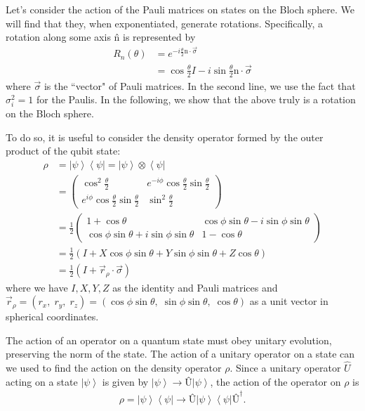 \documentclass[11pt]{article} %
\newcommand{\bra}[1]{\left\langle #1 \right|}
\newcommand{\ket}[1]{\left|#1\right\rangle}
\begin{document}
Let's consider the action of the Pauli matrices on states on the Bloch sphere. We will find that they, when exponentiated, generate rotations. Specifically, a rotation along some axis \^n is represented by
\begin{align}
    R_n(\theta) &= e^{-i\frac{\theta}{2}\textrm{\^n}\cdot\vec{\sigma}}\\
    &= \cos\frac{\theta}{2} I - i\sin\frac{\theta}{2} \textrm{\^n}\cdot\vec{\sigma}
\end{align}
where $\vec{\sigma}$ is the ``vector" of Pauli matrices. In the second line, we use the fact that $\sigma_i^2 = 1$ for the Paulis. In the following, we show that the above truly is a rotation on the Bloch sphere.

To do so, it is useful to consider the density operator formed by the outer product of the qubit state:
\begin{align}
    \rho &= \ket{\psi}\bra{\psi} = \ket{\psi}\otimes\bra{\psi}\\
    &=
        \begin{pmatrix}
            \cos^2\frac{\theta}{2} & e^{-i\phi}\cos\frac{\theta}{2}\sin\frac{\theta}{2} \\
            e^{i\phi}\cos\frac{\theta}{2}\sin\frac{\theta}{2} & \sin^2\frac{\theta}{2}
        \end{pmatrix}\nonumber\\
    &= \frac{1}{2}
        \begin{pmatrix}
            1+\cos\theta & \cos\phi\sin\theta - i\sin\phi\sin\theta \\
            \cos\phi\sin\theta + i\sin\phi\sin\theta & 1-\cos\theta
        \end{pmatrix}\\
    &= \frac{1}{2}\left(I+X\cos\phi\sin\theta + Y\sin\phi\sin\theta+Z\cos\theta\right)\\
    &= \frac{1}{2}\left(I+\vec{r}_\rho\cdot\vec{\sigma}\right)
\end{align}
where we have $I, X, Y, Z$ as the identity and Pauli matrices and $\vec{r}_\rho = (r_x,\;r_y,\;r_z) = (\cos\phi\sin\theta,\;\sin\phi\sin\theta,\;\cos\theta)$ as a unit vector in spherical coordinates.

The action of an operator on a quantum state must obey unitary evolution, preserving the norm of the state. The action of a unitary operator on a state can we used to find the action on the density operator $\rho$. Since a unitary operator $\hat{U}$ acting on a state $\ket{\psi}$ is given by $\ket{\psi} \rightarrow \textrm{\^U}\ket{\psi}$, the action of the operator on $\rho$ is
\begin{align}
    \rho = \ket{\psi}\bra{\psi} \rightarrow \textrm{\^U}\ket{\psi}\bra{\psi}\textrm{\^U}^\dagger.
\end{align}
\end{document}
